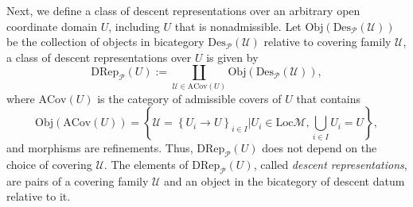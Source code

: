 \documentclass[reqno]{amsart}
\theoremstyle{definition}
\theoremstyle{remark}
\begin{document}
Next, we define a class of descent representations over an arbitrary open coordinate domain $U$, including $U$ that is nonadmissible. Let $\text{Obj}\left(\text{Des}_\mathscr{P}(\mathcal{U})\right)$ be the collection of objects in bicategory $\text{Des}_\mathscr{P}(\mathcal{U})$ relative to covering family $\mathcal{U}$, a class of descent representations over $U$ is given by
\begin{equation}
    \text{DRep}_\mathscr{P}(U) := \coprod\limits_{\mathcal{U}\in\text{ACov}(U)} {\text{Obj}\left(\text{Des}_\mathscr{P}(\mathcal{U})\right)} ,
\end{equation}
where $\text{ACov}(U)$ is the category of admissible covers of $U$ that contains
\begin{equation}
    \text{Obj}\left(\text{ACov}(U)\right) = \left\{\mathcal{U}=\left\{U_i\longrightarrow U\right\}_{i\in I}\bigg|U_i \in \text{Loc}\mathcal{M},\bigcup\limits_{i\in I}U_i = U\right\},
\end{equation}
and morphisms are refinements. Thus, $\text{DRep}_\mathscr{P}(U)$ does not depend on the choice of covering $\mathcal{U}$. The elements of $\text{DRep}_\mathscr{P}(U)$, called \textit{descent representations}, are pairs of a covering family $\mathcal{U}$ and an object in the bicategory of descent datum relative to it.
\end{document}
